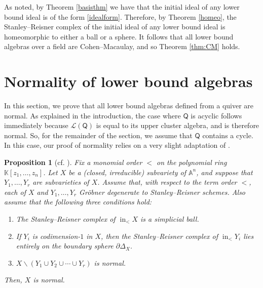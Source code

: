 \documentclass[10pt]{amsart}
\numberwithin{equation}{section}
\newtheorem{thm}{Theorem}[section]
\newtheorem{prop}[thm]{Proposition}
\theoremstyle{definition}
\theoremstyle{remark}
\DeclareMathOperator{\In}{\mathrm{in}}
\newcommand{\1}{^{-1}}
\def\Q{\mathsf{Q}}
\begin{document}
As noted, by Theorem \ref{basisthm} we have that the initial ideal of
any lower bound ideal is of the form \eqref{idealform}. Therefore, by
Theorem \ref{homeo}, the Stanley--Reisner complex of the initial ideal
of any lower bound ideal is homeomorphic to either a ball or a sphere.
It follows that all lower bound algebras over a field are
Cohen--Macaulay, and so Theorem \ref{thm:CM}
holds. 

\section{Normality of lower bound algebras}\label{sect:normality}

In this section, we prove that all lower bound algebras defined from a quiver are normal. As explained in the introduction, the case where $\Q$ is acyclic follows immediately because $\mathcal{L}(\Q)$ is equal to its upper cluster algebra, and is therefore normal. So, for the remainder of the section, we assume that $\Q$ contains a cycle.
In this case, our proof of normality relies on a very slight adaptation of \cite[Proposition 8.1]{KLS-Richardson}. 



\begin{prop}[cf. {\cite[Proposition 8.1]{KLS-Richardson}}]\label{prop:normalityInGeneral}
Fix a monomial order $<$ on the polynomial ring $\mathbb{K}[z_1,\dots,z_n]$. 
Let $X$ be a \upn(closed, irreducible\upn) subvariety of $\mathbb{A}^n$, and suppose that $Y_1,\dots, Y_r$ are subvarieties of $X$. %
Assume that, with respect to the term order $<$, each of $X$ and $Y_1,\dots, Y_r$ Gr\"obner degenerate to Stanley--Reisner schemes. Also assume that the following three conditions hold:
\begin{enumerate}
\item The Stanley--Reisner complex of $\In_<X$ is a simplicial ball.
\item If $Y_i$ is codimension-$1$ in $X$, then the Stanley--Reisner complex of $\In_<Y_i$ lies entirely on the boundary sphere $\partial \Delta_X$.
\item $X\smallsetminus (Y_1\cup Y_2\cup \cdots \cup Y_r)$ is normal.
\end{enumerate}
Then, $X$ is normal.
\end{prop}
\end{document}
